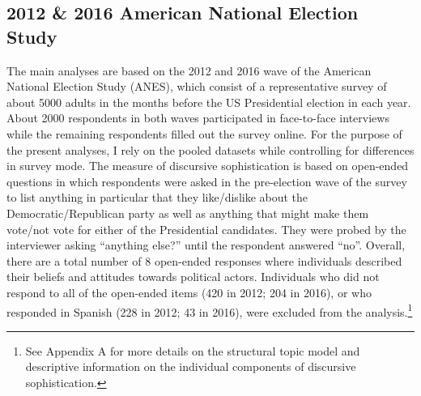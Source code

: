 \documentclass[12pt]{article}
\begin{document}
\subsection*{2012 \& 2016 American National Election Study}
The main analyses are based on the 2012 and 2016 wave of the American National Election Study (ANES), which consist of a representative survey of about 5000 adults in the months before the US Presidential election in each year. About 2000 respondents in both waves participated in face-to-face interviews while the remaining respondents filled out the survey online. For the purpose of the present analyses, I rely on the pooled datasets while controlling for differences in survey mode. The measure of discursive sophistication is based on open-ended questions in which respondents were asked in the pre-election wave of the survey to list anything in particular that they like/dislike about the Democratic/Republican party as well as anything that might make them vote/not vote for either of the Presidential candidates. They were probed by the interviewer asking ``anything else?'' until the respondent answered ``no''. Overall, there are a total number of 8 open-ended responses where individuals described their beliefs and attitudes towards political actors. Individuals who did not respond to all of the open-ended items (420 in 2012; 204 in 2016), or who responded in Spanish (228 in 2012; 43 in 2016), were excluded from the analysis.\footnote{See Appendix A for more details on the structural topic model and descriptive information on the individual components of discursive sophistication.}
\end{document}
